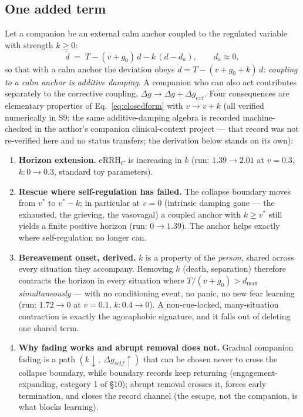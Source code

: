 \documentclass[9pt,twocolumn]{article}
\newcommand{\eRRHc}{\mathrm{eRRH}_{C}}
\begin{document}
\subsection{One added term}
Let a companion be an external calm anchor coupled to the regulated variable with strength $k\ge0$:
\begin{equation}
\dot d \;=\; T-(v+g_0)\,d-k\,(d-d_a),\qquad d_a\approx0,
\label{eq:coupling}
\end{equation}
so that with a calm anchor the deviation obeys $\dot d=T-(v+g_0+k)\,d$: \emph{coupling to a calm anchor is additive damping}. A companion who can also act contributes separately to the corrective coupling, $\Delta g\to\Delta g+\Delta g_{ext}$. Four consequences are elementary properties of Eq.~\ref{eq:closedform} with $v\to v+k$ (all verified numerically in S9; the same additive-damping algebra is recorded machine-checked in the author's companion clinical-context project \cite{lahtee2026birca} --- that record was not re-verified here and no status transfers; the derivation below stands on its own):
\begin{enumerate}[leftmargin=1.6em]
\item[P6] \textbf{Horizon extension.} $\eRRHc$ is increasing in $k$ (run: $1.39\to2.01$ at $v=0.3$, $k:0\to0.3$, standard toy parameters).
\item[P7] \textbf{Rescue where self-regulation has failed.} The collapse boundary moves from $v^{*}$ to $v^{*}-k$; in particular at $v=0$ (intrinsic damping gone --- the exhausted, the grieving, the vasovagal) a coupled anchor with $k\ge v^{*}$ still yields a finite positive horizon (run: $0\to1.39$). The anchor helps exactly where self-regulation no longer can.
\item[P8] \textbf{Bereavement onset, derived.} $k$ is a property of the \emph{person}, shared across every situation they accompany. Removing $k$ (death, separation) therefore contracts the horizon in every situation where $T/(v+g_0)>d_{\max}$ \emph{simultaneously} --- with no conditioning event, no panic, no new fear learning (run: $1.72\to0$ at $v=0.1$, $k:0.4\to0$). A non-cue-locked, many-situation contraction is exactly the agoraphobic signature, and it falls out of deleting one shared term.
\item[P9] \textbf{Why fading works and abrupt removal does not.} Gradual companion fading is a path $(k\downarrow,\ \Delta g_{self}\uparrow)$ that can be chosen never to cross the collapse boundary, while boundary records keep returning (engagement-expanding, category 1 of \S10); abrupt removal crosses it, forces early termination, and closes the record channel (the escape, not the companion, is what blocks learning).
\end{enumerate}
\end{document}
